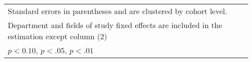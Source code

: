\begin{table}[htbp]
\begin{adjustbox}{max width=0.6\textwidth}
\begin{tabular}{l*{4}{c}}
\hline\hline
\multicolumn{5}{l}{\footnotesize Standard errors in parentheses and are clustered by cohort level.}\\
\multicolumn{5}{l}{\footnotesize Department and fields of study fixed effects are included in the estimation except column (2)}\\
\multicolumn{5}{l}{\footnotesize \sym{*} \(p<0.10\), \sym{**} \(p<.05\), \sym{***} \(p<.01\)}\\
\end{tabular}%
	\end{adjustbox}
\end{table}